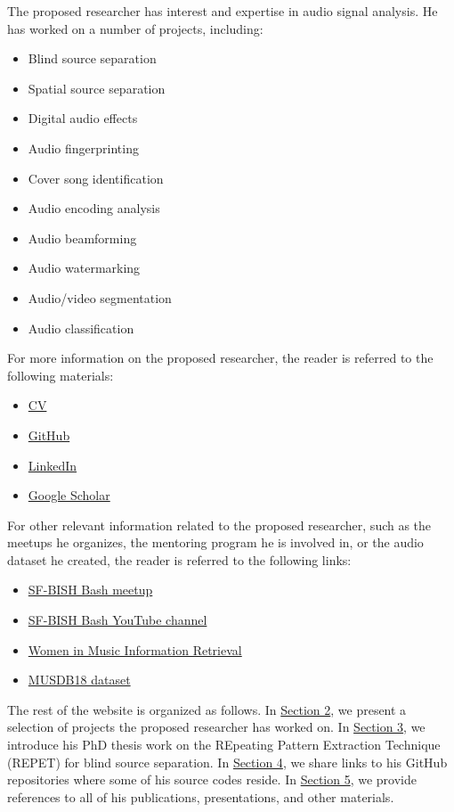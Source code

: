 \documentclass{article}
\begin{document}
The proposed researcher has interest and expertise in audio signal analysis. He has worked on a number of projects, including:
\begin{itemize}[noitemsep,topsep=0pt]
\item Blind source separation
\item Spatial source separation
\item Digital audio effects
\item Audio fingerprinting
\item Cover song identification
\item Audio encoding analysis
\item Audio beamforming
\item Audio watermarking
\item Audio/video segmentation
\item Audio classification
\end{itemize}

For more information on the proposed researcher, the reader is referred to the following materials:
\begin{itemize}[noitemsep,topsep=0pt]
\item \href{http://zafarrafii.com/Zafar Rafii - CV.pdf}{CV}
\item \href{https://github.com/zafarrafii}{GitHub}
\item \href{https://www.linkedin.com/in/zafarrafii/}{LinkedIn}
\item \href{https://scholar.google.com/citations?user=8wbS2EsAAAAJ&hl=en}{Google Scholar}
\end{itemize}

For other relevant information related to the proposed researcher, such as the meetups he organizes, the mentoring program he is involved in, or the audio dataset he created, the reader is referred to the following links:
\begin{itemize}[noitemsep,topsep=0pt]
\item \href{https://www.meetup.com/bishbash/}{SF-BISH Bash meetup}
\item \href{https://www.youtube.com/channel/UCfVTmVY__IObKq06vZFryxA}{SF-BISH Bash YouTube channel}
\item \href{https://wimir.wordpress.com/}{Women in Music Information Retrieval}
\item \href{https://sigsep.github.io/datasets/musdb.html#musdb18-compressed-stems}{MUSDB18 dataset}
\end{itemize}

The rest of the website is organized as follows. In \hyperref[sec:research]{Section 2}, we present a selection of projects the proposed researcher has worked on. In \hyperref[sec:repet]{Section 3}, we introduce his PhD thesis work on the REpeating Pattern Extraction Technique (REPET) for blind source separation. In \hyperref[sec:codes]{Section 4}, we share links to his GitHub repositories where some of his source codes reside. In \hyperref[sec:refs]{Section 5}, we provide references to all of his publications, presentations, and other materials.
\end{document}

